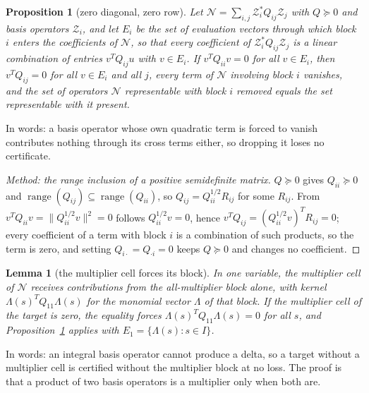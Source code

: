 \documentclass[12pt]{article}
\newcommand{\mcl}[1]{\mathcal{#1}}
\DeclareMathOperator{\range}{range}
\theoremstyle{plain}
\newtheorem{lemma}[theorem]{Lemma}
\newtheorem{proposition}[theorem]{Proposition}
\theoremstyle{definition}
\theoremstyle{remark}
\begin{document}
\begin{proposition}[zero diagonal, zero row]\label{prop:zerodiag}
Let $\mcl N=\sum_{i,j}\mcl Z_i^*Q_{ij}\mcl Z_j$ with $Q\succeq0$ and basis operators $\mcl Z_i$, and let $E_i$ be the set of evaluation vectors through which block $i$ enters the coefficients of $\mcl N$, so that every coefficient of $\mcl Z_i^*Q_{ij}\mcl Z_j$ is a linear combination of entries $v^TQ_{ij}u$ with $v\in E_i$. If $v^TQ_{ii}v=0$ for all $v\in E_i$, then $v^TQ_{ij}=0$ for all $v\in E_i$ and all $j$, every term of $\mcl N$ involving block $i$ vanishes, and the set of operators $\mcl N$ representable with block $i$ removed equals the set representable with it present.
\end{proposition}
In words: a basis operator whose own quadratic term is forced to vanish contributes nothing through its cross terms either, so dropping it loses no certificate.
\begin{proof}[Method: the range inclusion of a positive semidefinite matrix]
$Q\succeq0$ gives $Q_{ii}\succeq0$ and $\range(Q_{ij})\subseteq\range(Q_{ii})$, so $Q_{ij}=Q_{ii}^{1/2}R_{ij}$ for some $R_{ij}$. From $v^TQ_{ii}v=\|Q_{ii}^{1/2}v\|^2=0$ follows $Q_{ii}^{1/2}v=0$, hence $v^TQ_{ij}=(Q_{ii}^{1/2}v)^TR_{ij}=0$; every coefficient of a term with block $i$ is a combination of such products, so the term is zero, and setting $Q_{i\cdot}=Q_{\cdot i}=0$ keeps $Q\succeq0$ and changes no coefficient.
\end{proof}

\begin{lemma}[the multiplier cell forces its block]\label{lem:deltacell}
In one variable, the multiplier cell of $\mcl N$ receives contributions from the all-multiplier block alone, with kernel $\Lambda(s)^TQ_{11}\Lambda(s)$ for the monomial vector $\Lambda$ of that block. If the multiplier cell of the target is zero, the equality forces $\Lambda(s)^TQ_{11}\Lambda(s)=0$ for all $s$, and Proposition~\ref{prop:zerodiag} applies with $E_1=\{\Lambda(s):s\in I\}$.
\end{lemma}
In words: an integral basis operator cannot produce a delta, so a target without a multiplier cell is certified without the multiplier block at no loss. The proof is that a product of two basis operators is a multiplier only when both are.
\end{document}
